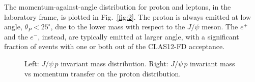 The momentum-against-angle distribution for proton and leptons, in the laboratory frame, is plotted in Fig.~\ref{fig:2}. 
The proton is always emitted at low angle, $\theta_P < 25^{\circ}$, due to the lower mass with respect to the $J/\psi$ meson. 
The $e^{+}$ and the $e^{-}$, instead, are typically emitted at larger angle, with a significant fraction of events with one or both out of the CLAS12-FD acceptance.
\begin{figure}[tpb]
\caption{\footnotesize \label{fig:1} Left: $J/\psi \, p$ invariant mass distribution. Right: $J/\psi \, p$ invariant mass vs momentum transfer on the proton distribution.}
\end{figure}

